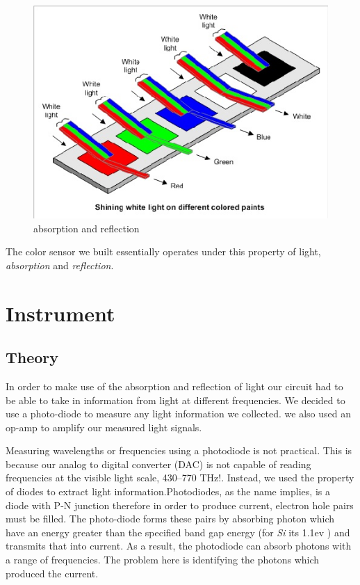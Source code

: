 \documentclass[paper=letter, fontsize=12pt]{article}
\begin{document}
	\begin{figure}[H]
	\centering
	\includegraphics[scale=.6]{absorb_reflect2.png}
	\caption{absorption and reflection}
	\label{absorption and reflection}
	\end{figure}

	The color sensor we built essentially operates under this property of light, \textit{absorption} and \textit{ reflection}.\\




\section*{Instrument}

\subsection*{Theory}

In order to make use of the absorption and reflection of light our circuit had to be able to take in information from light at different frequencies. We decided to use a photo-diode to measure any light information we collected. we also used an op-amp to amplify our measured light signals. 

Measuring wavelengths or frequencies using a photodiode is not practical. This is because our analog to digital converter (DAC) is not capable of reading frequencies at the visible light scale, 430–770 THz!. Instead, we used the property of diodes to extract light information.Photodiodes, as the name implies, is a diode with P-N junction therefore in order to produce current, electron hole pairs must be filled. The photo-diode forms these pairs by absorbing photon which have an energy greater than the specified band gap energy (for \textit{Si} its 1.1ev ) and transmits that into current. As a result, the photodiode can absorb photons with a range of frequencies. The problem here is identifying the photons which produced the current.
\end{document}
